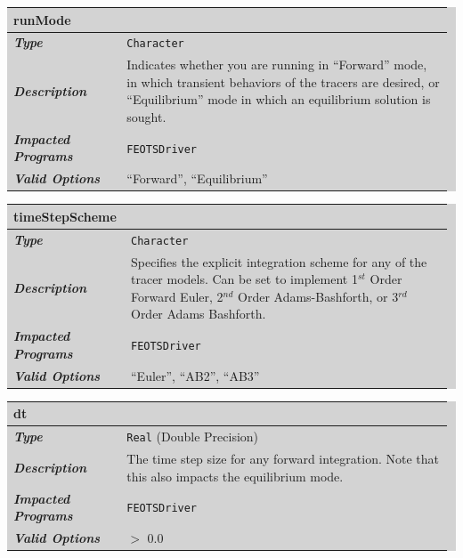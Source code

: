 \documentclass{softwaremanual}
\begin{document}

\noindent\begingroup\setlength{\fboxsep}{0pt}
\colorbox{lightgray}{
\begin{tabular}{p{0.25\linewidth} p{0.725\linewidth}}
\toprule
\textbf{runMode} & \\
\midrule
\textbf{\textit{Type}} & \texttt{Character} \\
\midrule
\textbf{\textit{Description}} & Indicates whether you are running in ``Forward'' mode, in which transient behaviors of the tracers are desired, or ``Equilibrium'' mode in which an equilibrium solution is sought.  \\
\midrule
\textbf{\textit{Impacted Programs}} & \texttt{FEOTSDriver} \\
\midrule
\textbf{\textit{Valid Options}}  & ``Forward'', ``Equilibrium'' \\
\bottomrule
\end{tabular}
}\endgroup

\noindent\begingroup\setlength{\fboxsep}{0pt}
\colorbox{lightgray}{
\begin{tabular}{p{0.25\linewidth} p{0.725\linewidth}}
\toprule
\textbf{timeStepScheme} & \\
\midrule
\textbf{\textit{Type}} & \texttt{Character} \\
\midrule
\textbf{\textit{Description}} & Specifies the explicit integration scheme for any of the tracer models. Can be set to implement 1$^{st}$ Order Forward Euler, 2$^{nd}$ Order Adams-Bashforth, or 3$^{rd}$ Order Adams Bashforth. \\
\midrule
\textbf{\textit{Impacted Programs}} & \texttt{FEOTSDriver} \\
\midrule
\textbf{\textit{Valid Options}}  & ``Euler'', ``AB2'', ``AB3'' \\
\bottomrule
\end{tabular}
}\endgroup


\noindent\begingroup\setlength{\fboxsep}{0pt}
\colorbox{lightgray}{
\begin{tabular}{p{0.25\linewidth} p{0.725\linewidth}}
\toprule
\textbf{dt} & \\
\midrule
\textbf{\textit{Type}} & \texttt{Real} (Double Precision) \\
\midrule
\textbf{\textit{Description}} & The time step size for any forward integration. Note that this also impacts the equilibrium mode.  \\
\midrule
\textbf{\textit{Impacted Programs}} &  \texttt{FEOTSDriver} \\
\midrule
\textbf{\textit{Valid Options}}  & $>$ 0.0 \\
\bottomrule
\end{tabular}
}\endgroup
\end{document}

